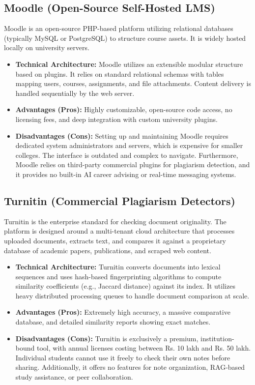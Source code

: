 \documentclass[12,Times new Roman,a4paper]{report}
\newcommand{\rupee}{Rs. }
\begin{document}
\subsection{Moodle (Open-Source Self-Hosted LMS)}
Moodle is an open-source PHP-based platform utilizing relational databases (typically MySQL or PostgreSQL) to structure course assets. It is widely hosted locally on university servers.
\begin{itemize}
    \item \textbf{Technical Architecture:} Moodle utilizes an extensible modular structure based on plugins. It relies on standard relational schemas with tables mapping users, courses, assignments, and file attachments. Content delivery is handled sequentially by the web server.
    \item \textbf{Advantages (Pros):} Highly customizable, open-source code access, no licensing fees, and deep integration with custom university plugins.
    \item \textbf{Disadvantages (Cons):} Setting up and maintaining Moodle requires dedicated system administrators and servers, which is expensive for smaller colleges. The interface is outdated and complex to navigate. Furthermore, Moodle relies on third-party commercial plugins for plagiarism detection, and it provides no built-in AI career advising or real-time messaging systems.
\end{itemize}

\subsection{Turnitin (Commercial Plagiarism Detectors)}
Turnitin is the enterprise standard for checking document originality. The platform is designed around a multi-tenant cloud architecture that processes uploaded documents, extracts text, and compares it against a proprietary database of academic papers, publications, and scraped web content.
\begin{itemize}
    \item \textbf{Technical Architecture:} Turnitin converts documents into lexical sequences and uses hash-based fingerprinting algorithms to compute similarity coefficients (e.g., Jaccard distance) against its index. It utilizes heavy distributed processing queues to handle document comparison at scale.
    \item \textbf{Advantages (Pros):} Extremely high accuracy, a massive comparative database, and detailed similarity reports showing exact matches.
    \item \textbf{Disadvantages (Cons):} Turnitin is exclusively a premium, institution-bound tool, with annual licenses costing between \rupee10 lakh and \rupee50 lakh. Individual students cannot use it freely to check their own notes before sharing. Additionally, it offers no features for note organization, RAG-based study assistance, or peer collaboration.
\end{itemize}
\end{document}
